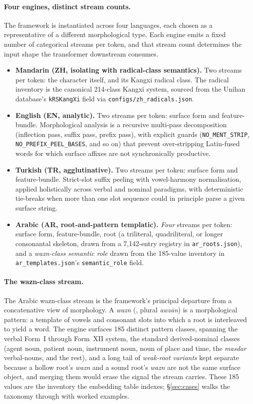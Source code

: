 \paragraph{Four engines, distinct stream counts.}
The framework is instantiated across four languages, each chosen as a representative of a different morphological type. Each engine emits a fixed number of categorical streams per token, and that stream count determines the input shape the transformer downstream consumes.

\begin{itemize}
\item \textbf{Mandarin (ZH, isolating with radical-class semantics).} Two streams per token: the character itself, and its Kangxi radical class. The radical inventory is the canonical 214-class Kangxi system, sourced from the Unihan database's \texttt{kRSKangXi} field via \texttt{configs/zh\_radicals.json}.
\item \textbf{English (EN, analytic).} Two streams per token: surface form and feature-bundle. Morphological analysis is a recursive multi-pass decomposition (inflection pass, suffix pass, prefix pass), with explicit guards (\texttt{NO\_MENT\_STRIP}, \texttt{NO\_PREFIX\_PEEL\_BASES}, and so on) that prevent over-stripping Latin-fused words for which surface affixes are not synchronically productive.
\item \textbf{Turkish (TR, agglutinative).} Two streams per token: surface form and feature-bundle. Strict-slot suffix peeling with vowel-harmony normalisation, applied holistically across verbal and nominal paradigms, with deterministic tie-breaks when more than one slot sequence could in principle parse a given surface string.
\item \textbf{Arabic (AR, root-and-pattern templatic).} \emph{Four} streams per token: surface form, feature-bundle, root (a triliteral, quadriliteral, or longer consonantal skeleton, drawn from a 7{,}142-entry registry in \texttt{ar\_roots.json}), and a \emph{wazn-class semantic role} drawn from the 185-value inventory in \texttt{ar\_templates.json}'s \texttt{semantic\_role} field.
\end{itemize}

\paragraph{The wazn-class stream.}
The Arabic wazn-class stream is the framework's principal departure from a concatenative view of morphology. A \emph{wazn} (, plural  \emph{awz\=an}) is a morphological pattern: a template of vowels and consonant slots into which a root is interleaved to yield a word. The engine surfaces 185 distinct pattern classes, spanning the verbal Form~I through Form~XII system, the standard derived-nominal classes (agent noun, patient noun, instrument noun, noun of place and time, the \emph{masdar} verbal-nouns, and the rest), and a long tail of \emph{weak-root variants} kept separate because a hollow root's \emph{wazn} and a sound root's \emph{wazn} are not the same surface object, and merging them would erase the signal the stream carries. These 185 values are the inventory the embedding table indexes; \S\ref{sec:cases} walks the taxonomy through with worked examples.

